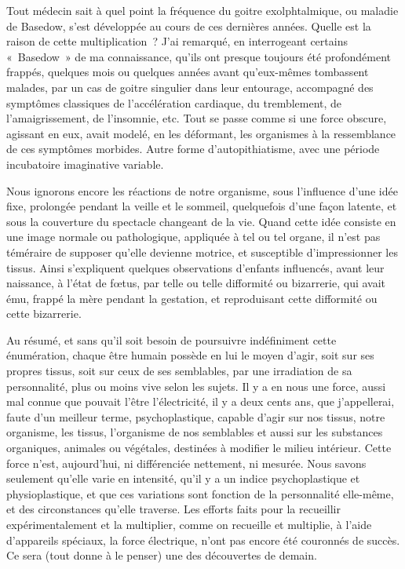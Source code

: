 \documentclass[french,twoside]{book} %
\begin{document}
Tout médecin sait à quel point la fréquence du goitre exolphtalmique, ou maladie de Basedow, s’est développée au cours de ces dernières années. Quelle est la raison de cette multiplication ? J’ai remarqué, en interrogeant certains « Basedow » de ma connaissance, qu’ils ont presque toujours été profondément frappés, quelques mois ou quelques années avant qu’eux-mêmes tombassent malades, par un cas de goitre singulier dans leur entourage, accompagné des symptômes classiques de l’accélération cardiaque, du tremblement, de l’amaigrissement, de l’insomnie, etc. Tout se passe comme si une force obscure, agissant en eux, avait modelé, en les déformant, les organismes à la ressemblance de ces symptômes morbides. Autre forme d’autopithiatisme, avec une période incubatoire imaginative variable.\par
Nous ignorons encore les réactions de notre organisme, sous l’influence d’une idée fixe, prolongée pendant la veille et le sommeil, quelquefois d’une façon latente, et sous la couverture du spectacle changeant de la vie. Quand cette idée consiste en une image normale ou pathologique, appliquée à tel ou tel organe, il n’est pas téméraire de supposer qu’elle devienne motrice, et susceptible d’impressionner les tissus. Ainsi s’expliquent quelques observations d’enfants influencés, avant leur naissance, à l’état de fœtus, par telle ou telle difformité ou bizarrerie, qui avait ému, frappé la mère pendant la gestation, et reproduisant cette difformité ou cette bizarrerie.\par
Au résumé, et sans qu’il soit besoin de poursuivre indéfiniment cette énumération, chaque être humain possède en lui le moyen d’agir, soit sur ses propres tissus, soit sur ceux de ses semblables, par une irradiation de sa personnalité, plus ou moins vive selon les sujets. Il y a en nous une force, aussi mal connue que pouvait l’être l’électricité, il y a deux cents ans, que j’appellerai, faute d’un meilleur terme, psychoplastique, capable d’agir sur nos tissus, notre organisme, les tissus, l’organisme de nos semblables et aussi sur les substances organiques, animales ou végétales, destinées à modifier le milieu intérieur. Cette force n’est, aujourd’hui, ni différenciée nettement, ni mesurée. Nous savons seulement qu’elle varie en intensité, qu’il y a un indice psychoplastique et physioplastique, et que ces variations sont fonction de la personnalité elle-même, et des circonstances qu’elle traverse. Les efforts faits pour la recueillir expérimentalement et la multiplier, comme on recueille et multiplie, à l’aide d’appareils spéciaux, la force électrique, n’ont pas encore été couronnés de succès. Ce sera (tout donne à le penser) une des découvertes de demain.\par
\end{document}
